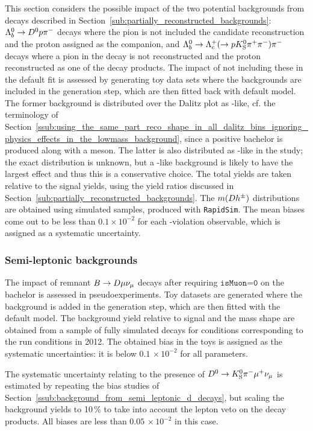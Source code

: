 This section considers the possible impact of the two potential backgrounds from \Lb decays described in Section~\ref{sub:partially_reconstructed_backgrounds}: ${{\Lambda}^0_{b}}\rightarrow{\ensuremath{{D}^0}} p{{\pi}^-}$  decays where the pion is not included the candidate reconstruction and the proton assigned as the companion, and ${{\Lambda}^0_{b}}\rightarrow{\ensuremath{{\Lambda}^+_{c}}}(\rightarrow p{{K}^0_{\mathrm{S}}} {{\pi}^+}{{\pi}^-}){{\pi}^-}$ decays  where a pion in the \Lc decay is not reconstructed and the proton reconstructed as one of the \D decay products. The impact of not including these in the default fit is assessed by generating toy data sets where the backgrounds are included in the generation step, which are then fitted back with default model. The former background is distributed over the Dalitz plot as \Dzb-like, cf. the terminology of Section~\ref{ssub:using_the_same_part_reco_shape_in_all_dalitz_bins_ignoring_physics_effects_in_the_lowmass_background}, since a positive bachelor is produced along with a \Dz meson. The latter is also distributed as \Dzb-like in the study; the exact distribution is unknown, but a \Dzb-like background is likely to have the largest effect and thus this is a conservative choice. The total yields are taken relative to the signal yields, using the yield ratios discussed in Section~\ref{sub:partially_reconstructed_backgrounds}.
The $m({D} h^\pm)$ distributions are obtained using simulated samples, produced with \texttt{RapidSim}. The mean biases come out to be less than $0.1\times 10^{-2}$ for each \CP-violation observable, which is assigned as a systematic uncertainty.

\subsubsection{Semi-leptonic backgrounds} %
\label{ssub:semi_leptonic_backgrounds_systematic}

The impact of remnant ${B}\rightarrow{\ensuremath{D}} \mu \nu_\mu$ decays after requiring $\texttt{isMuon=0}$ on the bachelor is assessed in pseudoexperiments. Toy datasets are generated where the background is added in the generation step, which are then fitted with the default model. The background yield relative to  signal and the mass shape are obtained from a sample of fully simulated decays for conditions corresponding to the run conditions in 2012. The obtained bias in the toys is assigned as the systematic uncertainties: it is below $0.1\,\times10^{-2}$ for all parameters.

The systematic uncertainty relating to the presence of ${{D}^0}\rightarrow{\ensuremath{{K}^0_{\mathrm{S}}}}{\ensuremath{{\pi}^-}}\mu^+\nu_\mu$ is estimated by repeating the bias studies of Section~\ref{ssub:background_from_semi_leptonic_d_decays}, but scaling the background yields to 10\,\% to take into account the lepton veto on the \D decay products. All biases are less than $0.05\,\times 10^{-2}$ in this case.


